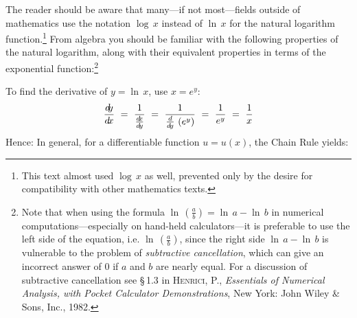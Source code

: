 The reader should be aware that many---if not most---fields outside of
mathematics use the notation $\log\,x$ instead of $\ln\,x$ for the natural
logarithm function.\footnote{This text almost used $\log\,x$ as well, prevented
only by the desire for compatibility with other mathematics texts.}
\newpage
From algebra you should be familiar with the following properties of the natural
logarithm, along with their equivalent properties in terms of the exponential
function:\footnote{Note that when using the formula
$\ln\,\left(\frac{a}{b}\right) = \ln\,a - \ln\,b$
in numerical computations---especially on hand-held calculators---it is
preferable to use the left side of the equation, i.e.
$\ln\,\left(\frac{a}{b}\right)$, since the right side $\ln\,a - \ln\,b$ is
vulnerable to the problem of \emph{subtractive cancellation}, which can give an
incorrect answer of 0 if $a$ and $b$ are nearly equal. For a discussion
of subtractive cancellation see \S\,1.3 in \textsc{Henrici, P.},
\emph{Essentials of Numerical Analysis, with Pocket Calculator Demonstrations},
New York: John Wiley \& Sons, Inc., 1982.}


\noindent To find the derivative of $y = \ln\,x$, use $x = e^y$:
\begin{displaymath}
 \frac{d\negmedspace y}{d\!x} ~=~ \frac{1}{\frac{d\negmedspace x}{d\!y}} ~=~ \frac{1}{\frac{d}{d\!y}\,\left(e^y\right)} ~=~ \frac{1}{e^y} ~=~ \frac{1}{x}
\end{displaymath}
Hence:
In general, for a differentiable function $u = u(x)$, the Chain Rule yields:

